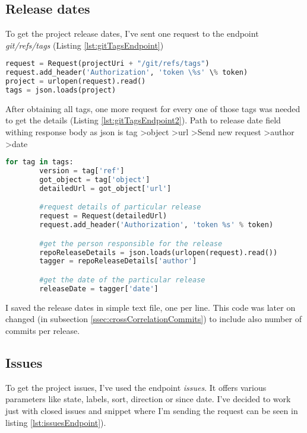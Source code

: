 \subsection{Release dates} \label{ssec:gitReleaseDatesMining}
To get the project release dates, I've sent one request to the endpoint \textit{git/refs/tags} (Listing \ref{lst:gitTagsEndpoint})

\begin{lstlisting}[caption={Requesting all project tags git api tags endpoint},label={lst:gitTagsEndpoint},language=Python]
request = Request(projectUri + "/git/refs/tags")
request.add_header('Authorization', 'token \%s' \% token)
project = urlopen(request).read()
tags = json.loads(project)
\end{lstlisting}

After obtaining all tags, one more request for every one of those tags was needed to get the details (Listing \ref{lst:gitTagsEndpoint2}). Path to release date field withing response body as json is tag \textgreater  object \textgreater  url \textgreater  Send new request \textgreater  author \textgreater  date

\begin{lstlisting}[caption={Requesting tag details and accessing release date},label={lst:gitTagsEndpoint2},language=Python]
	for tag in tags:
		version = tag['ref']
		got_object = tag['object']
		detailedUrl = got_object['url']

		#request details of particular release
		request = Request(detailedUrl)
		request.add_header('Authorization', 'token %s' % token)

		#get the person responsible for the release
		repoReleaseDetails = json.loads(urlopen(request).read())
		tagger = repoReleaseDetails['author']

		#get the date of the particular release
		releaseDate = tagger['date']
\end{lstlisting}

I saved the release dates in simple text file, one per line. This code was later on changed (in subsection \ref{ssec:crossCorrelationCommits}) to include also number of commits per release.

\subsection{Issues} \label{ssec:issuesMining}
To get the project issues, I've used the endpoint \textit{issues}. It offers various parameters like state, labels, sort, direction or since date. I've decided to work just with closed issues and snippet where I'm sending the request can be seen in listing \ref{lst:issuesEndpoint}).

